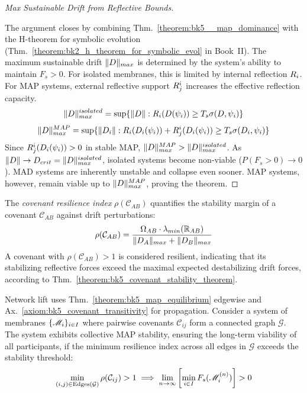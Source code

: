 \begin{proof}[Max Sustainable Drift from Reflective Bounds]
\label{proof:bk5_max_sustainable_drift}
\leavevmode

The argument closes by combining Thm.~\ref{theorem:bk5__map_dominance}
with the H-theorem for symbolic evolution
(Thm.~\ref{theorem:bk2_h_theorem_for_symbolic_evol} in Book~II).
The maximum sustainable drift $\|D\|_{max}$ is determined by the system's ability to maintain $F_s > 0$. For isolated membranes, this is limited by internal reflection $R_i$. For MAP systems, external reflective support $R_j^i$ increases the effective reflection capacity.
\begin{equation}
\|D\|_{max}^{isolated} = \sup \{\|D\| : R_i(D(\psi_i)) \geq T_s \sigma(D, \psi_i) \}
\end{equation}
\begin{equation}
\|D\|_{max}^{MAP} = \sup \{\|D_i\| : R_i(D_i(\psi_i)) + R_j^i(D_i(\psi_i)) \geq T_s \sigma(D_i, \psi_i) \}
\end{equation}
Since $R_j^i(D_i(\psi_i)) > 0$ in stable MAP, $\|D\|_{max}^{MAP} > \|D\|_{max}^{isolated}$. As $\|D\| \to D_{crit} = \|D\|_{max}^{isolated}$, isolated systems become non-viable ($P(F_s>0) \to 0$). MAD systems are inherently unstable and collapse even sooner. MAP systems, however, remain viable up to $\|D\|_{max}^{MAP}$, proving the theorem.
\end{proof}
\begin{definition} \label{definition:bk5_covenant_resilience_index}
The \emph{covenant resilience index} $\rho(\mathcal{C}_{AB})$ quantifies the stability margin of a covenant $\mathcal{C}_{AB}$ against drift perturbations:
\begin{equation}
\rho(\mathcal{C}_{AB}) = \frac{\Omega_{AB} \cdot \lambda_{min}(\mathbb{R}_{AB})}{\|D_A\|_{max} + \|D_B\|_{max}}
\end{equation}
A covenant with $\rho(\mathcal{C}_{AB}) > 1$ is considered resilient, indicating that its stabilizing reflective forces exceed the maximal expected destabilizing drift forces, according to Thm.~\ref{theorem:bk5_covenant_stability_theorem}.
\end{definition}
\begin{lemma} \label{lemma:bk5_multi_membrane_map_extension}
Network lift uses Thm.~\ref{theorem:bk5_map_equilibrium} edgewise and Ax.~\ref{axiom:bk5_covenant_transitivity} for propagation.
Consider a system of membranes $\{\mathscr{M}_i\}_{i \in I}$ where pairwise covenants $\mathcal{C}_{ij}$ form a connected graph $\mathcal{G}$. The system exhibits collective MAP stability, ensuring the long-term viability of all participants, if the minimum resilience index across all edges in $\mathcal{G}$ exceeds the stability threshold:
\begin{equation}
\min_{(i,j) \in \text{Edges}(\mathcal{G})} \rho(\mathcal{C}_{ij}) > 1 \implies \lim_{n \to \infty} \left[ \min_{i \in I} F_s(\mathscr{M}_i^{(n)}) \right] > 0
\end{equation}
\end{lemma}
